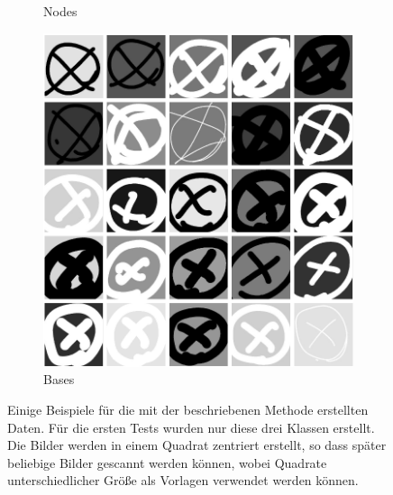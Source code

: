 \begin{figure}
\begin{subfigure}[b]{0.3\textwidth}
        \caption{Nodes}
        \label{fig:25_links}
    \end{subfigure}
    \begin{subfigure}[b]{0.3\textwidth}
        \includegraphics[width=\textwidth]{images/25_x.png}
        \caption{Bases}
        \label{fig:25_bases}
    \end{subfigure}
    \caption{ Einige Beispiele für die mit der beschriebenen Methode erstellten Daten. Für die ersten Tests wurden nur diese drei Klassen erstellt. Die Bilder werden in einem Quadrat zentriert erstellt, so dass später beliebige Bilder gescannt werden können, wobei Quadrate unterschiedlicher Größe als Vorlagen verwendet werden können. }
    \label{fig:generated_data_samples}
\end{figure}

